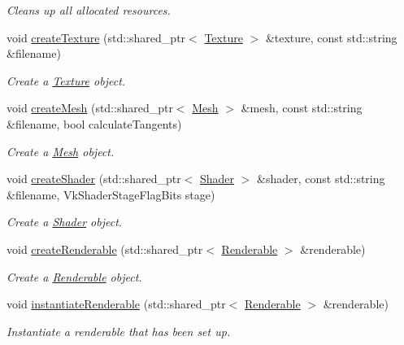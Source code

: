 \begin{DoxyCompactItemize}
\begin{DoxyCompactList}\small\item\em Cleans up all allocated resources. \end{DoxyCompactList}\item 
void \mbox{\hyperlink{class_render_system_afae24ad1ef810abc7a16ca331f4e6eef}{create\+Texture}} (std\+::shared\+\_\+ptr$<$ \mbox{\hyperlink{class_texture}{Texture}} $>$ \&texture, const std\+::string \&filename)
\begin{DoxyCompactList}\small\item\em Create a \mbox{\hyperlink{class_texture}{Texture}} object. \end{DoxyCompactList}\item 
void \mbox{\hyperlink{class_render_system_a16952550c2f754cd60d2a9630f6c1f0d}{create\+Mesh}} (std\+::shared\+\_\+ptr$<$ \mbox{\hyperlink{class_mesh}{Mesh}} $>$ \&mesh, const std\+::string \&filename, bool calculate\+Tangents)
\begin{DoxyCompactList}\small\item\em Create a \mbox{\hyperlink{class_mesh}{Mesh}} object. \end{DoxyCompactList}\item 
void \mbox{\hyperlink{class_render_system_ac0558495d4560e36e338336645f34153}{create\+Shader}} (std\+::shared\+\_\+ptr$<$ \mbox{\hyperlink{class_shader}{Shader}} $>$ \&shader, const std\+::string \&filename, Vk\+Shader\+Stage\+Flag\+Bits stage)
\begin{DoxyCompactList}\small\item\em Create a \mbox{\hyperlink{class_shader}{Shader}} object. \end{DoxyCompactList}\item 
void \mbox{\hyperlink{class_render_system_aa90bf882e4c3136ee272a1733eb38291}{create\+Renderable}} (std\+::shared\+\_\+ptr$<$ \mbox{\hyperlink{class_renderable}{Renderable}} $>$ \&renderable)
\begin{DoxyCompactList}\small\item\em Create a \mbox{\hyperlink{class_renderable}{Renderable}} object. \end{DoxyCompactList}\item 
void \mbox{\hyperlink{class_render_system_aeaee982760399e62180207c573a469e7}{instantiate\+Renderable}} (std\+::shared\+\_\+ptr$<$ \mbox{\hyperlink{class_renderable}{Renderable}} $>$ \&renderable)
\begin{DoxyCompactList}\small\item\em Instantiate a renderable that has been set up. \end{DoxyCompactList}\item 

\end{DoxyCompactItemize}
